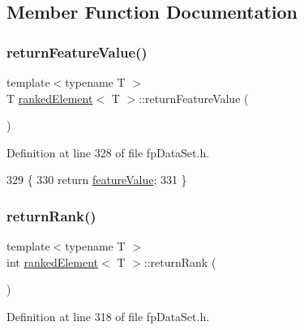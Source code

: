 \subsection{Member Function Documentation}
\mbox{\label{classrankedElement_ab49ad201b4452d0ec63f850f3eec26cc}} 
\subsubsection{\texorpdfstring{return\+Feature\+Value()}{returnFeatureValue()}}
{\footnotesize\ttfamily template$<$typename T $>$ \\
T \hyperlink{classrankedElement}{ranked\+Element}$<$ T $>$\+::return\+Feature\+Value (\begin{DoxyParamCaption}{ }\end{DoxyParamCaption})\hspace{0.3cm}{\ttfamily [inline]}}



Definition at line 328 of file fp\+Data\+Set.\+h.


\begin{DoxyCode}
329         \{
330             \textcolor{keywordflow}{return} \hyperlink{classrankedElement_a710e6e4cc93b791e5cd1fd21716be2e9}{featureValue};
331         \}
\end{DoxyCode}
\mbox{\label{classrankedElement_a1de90c49ea4143986f5fc9b197758518}} 
\subsubsection{\texorpdfstring{return\+Rank()}{returnRank()}}
{\footnotesize\ttfamily template$<$typename T $>$ \\
int \hyperlink{classrankedElement}{ranked\+Element}$<$ T $>$\+::return\+Rank (\begin{DoxyParamCaption}{ }\end{DoxyParamCaption})\hspace{0.3cm}{\ttfamily [inline]}}



Definition at line 318 of file fp\+Data\+Set.\+h.


